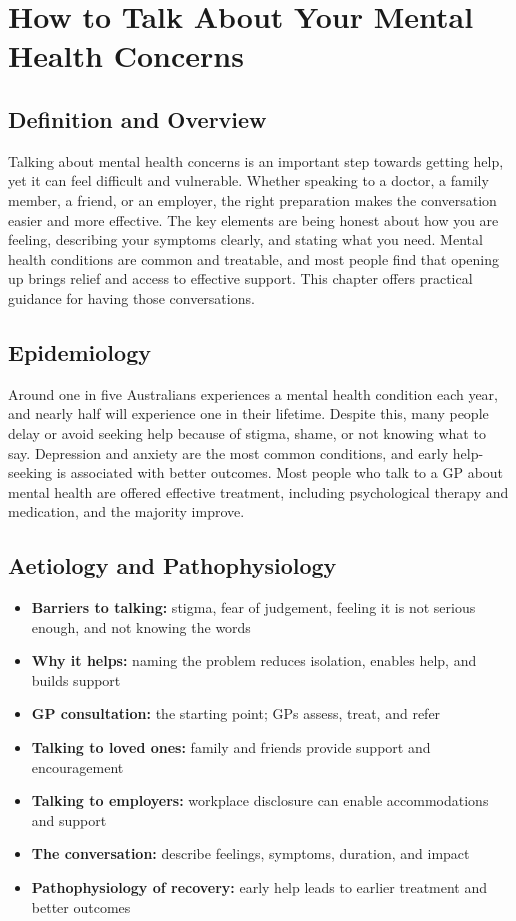 \chapter{How to Talk About Your Mental Health Concerns}

\section*{Definition and Overview}
Talking about mental health concerns is an important step towards getting help, yet it can feel difficult and vulnerable. Whether speaking to a doctor, a family member, a friend, or an employer, the right preparation makes the conversation easier and more effective. The key elements are being honest about how you are feeling, describing your symptoms clearly, and stating what you need. Mental health conditions are common and treatable, and most people find that opening up brings relief and access to effective support. This chapter offers practical guidance for having those conversations.

\section*{Epidemiology}
Around one in five Australians experiences a mental health condition each year, and nearly half will experience one in their lifetime. Despite this, many people delay or avoid seeking help because of stigma, shame, or not knowing what to say. Depression and anxiety are the most common conditions, and early help-seeking is associated with better outcomes. Most people who talk to a GP about mental health are offered effective treatment, including psychological therapy and medication, and the majority improve.

\section*{Aetiology and Pathophysiology}
\begin{itemize}
    \item \textbf{Barriers to talking:} stigma, fear of judgement, feeling it is not serious enough, and not knowing the words
    \item \textbf{Why it helps:} naming the problem reduces isolation, enables help, and builds support
    \item \textbf{GP consultation:} the starting point; GPs assess, treat, and refer
    \item \textbf{Talking to loved ones:} family and friends provide support and encouragement
    \item \textbf{Talking to employers:} workplace disclosure can enable accommodations and support
    \item \textbf{The conversation:} describe feelings, symptoms, duration, and impact
    \item \textbf{Pathophysiology of recovery:} early help leads to earlier treatment and better outcomes
\end{itemize}

